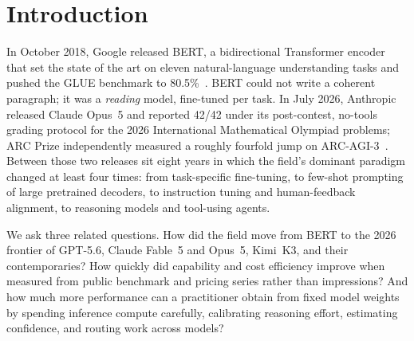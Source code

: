 \documentclass[11pt]{article}
\begin{document}
\tableofcontents
\newpage

\section{Introduction}\label{sec:intro}

In October 2018, Google released BERT, a bidirectional Transformer encoder that
set the state of the art on eleven natural-language understanding tasks and
pushed the GLUE benchmark to 80.5\%~\cite{devlin2019bert}. BERT could not write
a coherent paragraph; it was a \emph{reading} model, fine-tuned per task. In
July 2026, Anthropic released Claude Opus~5 and reported 42/42 under its
post-contest, no-tools grading protocol for the 2026 International Mathematical
Olympiad problems; ARC Prize independently measured a roughly fourfold jump on
ARC-AGI-3~\cite{anthropic2026opus5card,arcprize2026opus5}. Between those
two releases sit eight years in which the field's dominant paradigm changed at
least four times: from task-specific fine-tuning, to few-shot prompting of
large pretrained decoders, to instruction tuning and human-feedback alignment,
to reasoning models and tool-using agents.

We ask three related questions. How did the field move from BERT to the
2026 frontier of GPT-5.6, Claude Fable~5 and Opus~5, Kimi~K3, and their
contemporaries? How quickly did capability and cost efficiency improve when
measured from public benchmark and pricing series rather than impressions?
And how much more performance can a practitioner obtain from fixed model
weights by spending inference compute carefully, calibrating reasoning effort,
estimating confidence, and routing work across models?
\end{document}

